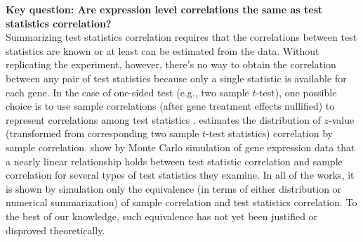 \documentclass[12pt, a4paper]{article}
\begin{document}
	\textbf{Key question: Are  expression level correlations the same as test statistics correlation?}\\
	Summarizing test statistics correlation requires that the correlations between test statistics 
	are known or at least can be estimated from the data. Without 
	replicating the experiment, however, there's no way to obtain the correlation between any pair 
	of test statistics because only a single  statistic is available for each gene. In the case of 
	one-sided test (e.g., two sample $t$-test), one possible choice is to use sample 
	correlations (after gene treatment effects nullified) to represent correlations among test 
	statistics \citep{barry2008statistical, efron2007correlation, wu2012camera, 
	yaari2013quantitative}. 
	\citet{efron2007correlation} estimates the distribution of $z$-value (transformed from corresponding two sample $t$-test statistics) 
	correlation by sample correlation. \citet{barry2008statistical} show by Monte Carlo simulation of gene expression data that a nearly linear 
	relationship holds between test statistic correlation and sample correlation for several types 
	of test statistics they examine. In all of the works, it is shown by simulation only the 
	equivalence (in terms of either distribution or numerical summarization) of sample correlation  
	and test statistics	correlation. 
	 To the best of our knowledge, such equivalence has not yet been justified or disproved 
	 theoretically.
	
\end{document}
